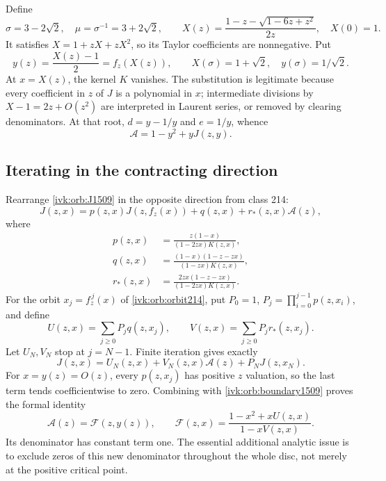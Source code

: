 \documentclass[11pt,letterpaper]{article}
\theoremstyle{remark}\newtheorem{remark}[theorem]{Remark}
\begin{document}
Define
\begin{equation}\label{ivk:orb:rho1509}
\sigma=3-2\sqrt2,\quad \mu=\sigma^{-1}=3+2\sqrt2,\qquad
X(z)=\frac{1-z-\sqrt{1-6z+z^2}}{2z},\quad X(0)=1.
\end{equation}
It satisfies $X=1+zX+zX^2$, so its Taylor coefficients are nonnegative.
Put
\begin{equation}\label{ivk:orb:y1509}
y(z)=\frac{X(z)-1}{2}=f_z(X(z)),\qquad
X(\sigma)=1+\sqrt2,\quad y(\sigma)=1/\sqrt2.
\end{equation}
At $x=X(z)$, the kernel $K$ vanishes. The substitution is legitimate
because every coefficient in $z$ of $J$ is a polynomial in $x$;
intermediate divisions by $X-1=2z+O(z^2)$ are interpreted in Laurent
series, or removed by clearing denominators. At that root,
$d=y-1/y$ and $e=1/y$, whence
\begin{equation}\label{ivk:orb:boundary1509}
\mathcal A=1-y^2+yJ(z,y).
\end{equation}

\subsection{Iterating in the contracting direction}
Rearrange \eqref{ivk:orb:J1509} in the opposite direction from class 214:
\begin{equation}\label{ivk:orb:back1509}
J(z,x)=p(z,x)J(z,f_z(x))+q(z,x)+r_*(z,x)\mathcal A(z),
\end{equation}
where
\begin{equation}\label{ivk:orb:pqr1509}
\begin{aligned}
p(z,x)&=\frac{z(1-x)}{(1-2zx)K(z,x)},\\
q(z,x)&=\frac{(1-x)(1-z-zx)}{(1-zx)K(z,x)},\\
r_*(z,x)&=\frac{2zx(1-z-zx)}{(1-2zx)K(z,x)}.
\end{aligned}
\end{equation}
For the orbit $x_j=f_z^{\,j}(x)$ of \eqref{ivk:orb:orbit214}, put
$P_0=1$, $P_j=\prod_{i=0}^{j-1}p(z,x_i)$, and define
\begin{equation}\label{ivk:orb:UV1509}
U(z,x)=\sum_{j\ge0}P_jq(z,x_j),\qquad
V(z,x)=\sum_{j\ge0}P_jr_*(z,x_j).
\end{equation}
Let $U_N,V_N$ stop at $j=N-1$. Finite iteration gives exactly
\[
J(z,x)=U_N(z,x)+V_N(z,x)\mathcal A(z)+P_NJ(z,x_N).
\]
For $x=y(z)=O(z)$, every $p(z,x_j)$ has positive $z$ valuation, so
the last term tends coefficientwise to zero. Combining with
\eqref{ivk:orb:boundary1509} proves the formal identity
\begin{equation}\label{ivk:orb:F1509}
\mathcal A(z)=\mathcal F(z,y(z)),\qquad
\mathcal F(z,x)=\frac{1-x^2+xU(z,x)}{1-xV(z,x)}.
\end{equation}
Its denominator has constant term one. The essential additional analytic
issue is to exclude zeros of this new denominator throughout the whole
disc, not merely at the positive critical point.
\end{document}

